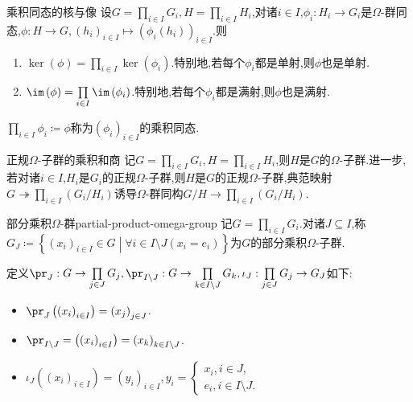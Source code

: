 \begin{proposition}{乘积同态的核与像}{}
	设$G=\prod\limits_{i\in I}G_{i},H=\prod\limits_{i\in I}H_{i}$,对诸$i\in I$,$\phi_{i}:H_{i}\to G_{i}$是$\Omega$-群同态,$\phi:H\to G,\left(h_{i}\right)_{i\in I}\mapsto\left(\phi_{i}\left(h_{i}\right)\right)_{i\in I}$.则
	\begin{enumerate}
		\item $\ker\left(\phi\right)=\prod\limits_{i\in I}\ker\left(\phi_{i}\right)$.特别地,若每个$\phi_{i}$都是单射,则$\phi$也是单射.
		\item $\im\left(\phi\right)=\prod\limits_{i\in I}\im\left(\phi_{i}\right)$.特别地,若每个$\phi_{i}$都是满射,则$\phi$也是满射.
	\end{enumerate}
	$\prod\limits_{i\in I}\phi_{i}\coloneq\phi$称为$\left(\phi_{i}\right)_{i\in I}$的乘积同态.
\end{proposition}

\begin{corollary}{正规$\Omega$-子群的乘积和商}{}
	记$G=\prod\limits_{i\in I}G_{i},H=\prod\limits_{i\in I}H_{i}$,则$H$是$G$的$\Omega$-子群.进一步,若对诸$i\in I$,$H_{i}$是$G_{i}$的正规$\Omega$-子群,则$H$是$G$的正规$\Omega$-子群,典范映射$G\twoheadrightarrow\prod\limits_{i\in I}\left(G_{i}/H_{i}\right)$诱导$\Omega$-群同构$G/H\to\prod\limits_{i\in I}\left(G_{i}/H_{i}\right)$.
\end{corollary}

\begin{definition}{部分乘积$\Omega$-群}{partial-product-omega-group}
	记$G=\prod\limits_{i\in I}G_{i}$.对诸$J\subseteq I$,称$G_{J}\coloneq\left\{\left(x_{i}\right)_{i\in I}\in G\middle|\forall i\in I\setminus J\left(x_{i}=e_{i}\right)\right\}$为$G$的部分乘积$\Omega$-子群.
	
	定义$\pr_{J}:G\to\prod\limits_{j\in J}G_{j},\pr_{I\setminus J}:G\to\prod\limits_{k\in I\setminus J}G_{k},\iota_{J}:\prod\limits_{j\in J}G_{j}\to G_{J}$如下:
	\begin{itemize}
		\item $\pr_{J}\left(\left(x_{i}\right)_{i\in I}\right)=\left(x_{j}\right)_{j\in J}$.
		\item $\pr_{I\setminus J}=\left(\left(x_{i}\right)_{i\in I}\right)=\left(x_{k}\right)_{k\in I\setminus J}$.
		\item $\iota_{J}\left(\left(x_{i}\right)_{i\in I}\right)=\left(y_{i}\right)_{i\in I},y_{i}=
		\begin{cases}
			x_{i},i\in J,\\
			e_{i},i\in I\setminus J.
		\end{cases}$
	\end{itemize}
\end{definition}

